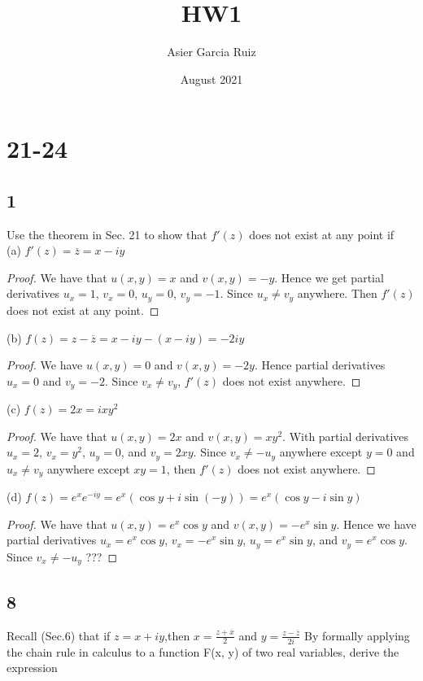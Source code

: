 \documentclass{article}
\title{HW1}
\author{Asier Garcia Ruiz }
\date{August 2021}
\begin{document}
    \maketitle

    \section*{21-24}
    \subsection*{1}
    Use the theorem in Sec. 21 to show that $f'(z)$ does not exist at any point if\\
    (a) $f'(z) = \overline{z} = x - iy$
    \begin{proof}
        We have that $u(x,y) = x$ and $v(x,y) = -y$. Hence we get partial derivatives
        $u_x = 1$, $v_x = 0$, $u_y = 0$, $v_y = -1$. Since $u_x \neq v_y$ anywhere. Then $f'(z)$ does not
        exist at any point.
    \end{proof}
    (b) $f(z) = z - \overline{z} = x - iy - (x - iy) = -2iy$
    \begin{proof}
        We have $u(x,y) = 0$ and $v(x,y) = -2y$. Hence partial derivatives $u_x = 0$ and $v_y = -2$.
        Since $v_x \neq v_y$, $f'(z)$ does not exist anywhere.
    \end{proof}
    (c) $f(z) = 2x = ixy^2$
    \begin{proof}
        We have that $u(x,y) = 2x$ and $v(x,y) = xy^2$. With partial derivatives $u_x = 2$, $v_x = y^2$,
        $u_y = 0$, and $v_y = 2xy$. Since $v_x \neq -u_y$ anywhere except $y = 0$ and $u_x \neq v_y$
        anywhere except $xy = 1$, then $f'(z)$ does not exist anywhere.
    \end{proof}
    (d) $f(z) = e^x e^{-iy} = e^x(\cos y + i\sin(-y)) = e^x(\cos y - i\sin y)$
    \begin{proof}
       We have that $u(x,y) = e^x\cos y$ and $v(x,y) = -e^x\sin y$. Hence we have partial derivatives
       $u_x = e^x\cos y$, $v_x = -e^x\sin y$, $u_y = e^x\sin y$, and $v_y = e^x\cos y$. Since $v_x \neq -u_y$
       ??? 
    \end{proof}
    \subsection*{8}
    Recall (Sec.6) that if $z=x+iy$,then $x = \frac{z + \overline{x}}{2}$ and 
    $y = \frac{z - \overline{z}}{2i}$ By formally applying the chain rule in calculus to a function F(x, y) of 
    two real variables, derive the expression
\end{document}
